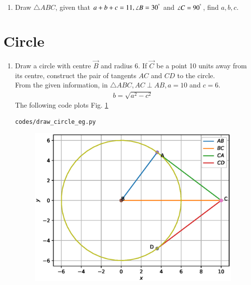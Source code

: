 \documentclass[journal,12pt,twocolumn]{IEEEtran}
\renewcommand\thesection{\arabic{section}}
\begin{document}
\begin{enumerate}[label=\thesection.\arabic*
,ref=\thesection.\theenumi]
Solving the equivalent matrix equation gives the desired answer.
\item Draw $\triangle ABC$,  given that $a+b+c = 11, \angle B = 30^{\degree}$ and $\angle C = 90^{\degree}$, 
find 
$a,b,c$.
\end{enumerate}
\section{Circle}
\begin{enumerate}[label=\thesection.\arabic*
,ref=\thesection.\theenumi]
\item Draw a circle with centre $\vec{B}$ and radius 6.  If $\vec{C}$ be  a point 10 units  away from its 
centre, construct the pair of tangents $AC$ and $CD$ to the 
circle.
\\
\solution From the given information, in $\triangle ABC, AC \perp AB, a = 
10$ and $c = 6$.
\begin{align}
b =  \sqrt{a^2-c^2}
\end{align}
The following code plots Fig. \ref{fig:circle}
\begin{lstlisting}
codes/draw_circle_eg.py
\end{lstlisting}
\begin{figure}[!ht]
\includegraphics[width=\columnwidth]{./figs/circle.eps}
\caption{}
\label{fig:circle}
\end{figure}

%


\end{enumerate}
\end{document}
